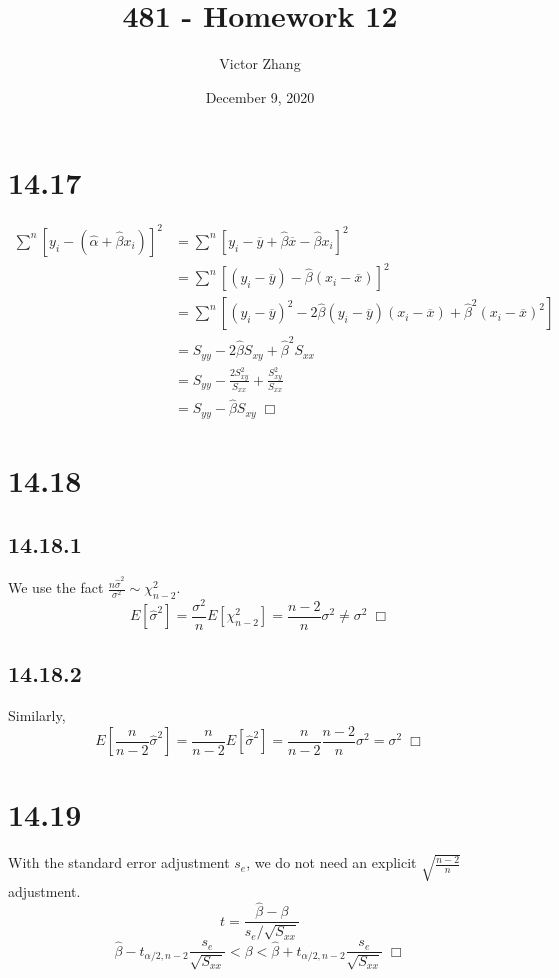 \documentclass{article}
\title{481 - Homework 12}
\author{Victor Zhang}
\date{December 9, 2020}
\begin{document}
\maketitle

\section*{14.17}
\begin{equation*}
\begin{split}
\sum\limits^n [y_i - (\hat{\alpha} + \hat{\beta}x_i)]^2 &= \sum\limits^n [y_i-\overline{y} + \hat{\beta}\overline{x} -\hat{\beta}x_i]^2\\
&= \sum\limits^n [(y_i-\overline{y}) - \hat{\beta}(x_i-\overline{x})]^2\\
&= \sum\limits^n [(y_i-\overline{y})^2 - 2\hat{\beta}(y_i-\overline{y})(x_i-\overline{x}) + \hat{\beta}^2(x_i-\overline{x})^2]\\
&= S_{yy} - 2\hat{\beta}S_{xy} + \hat{\beta}^2S_{xx}\\
&= S_{yy} -\frac{2S_{xy}^2}{S_{xx}} + \frac{S_{xy}^2}{S_{xx}}\\
&= S_{yy} - \hat{\beta}S_{xy} \; \Box
\end{split}
\end{equation*}

\section*{14.18}
\subsection*{14.18.1}
We use the fact $\frac{n\hat{\sigma}^2}{\sigma^2} \sim \chi^2_{n-2}$.
$$E[\hat{\sigma}^2] = \frac{\sigma^2}{n} E[\chi^2_{n-2}] = \frac{n-2}{n}\sigma^2 \neq \sigma^2 \;\Box$$
\subsection*{14.18.2}
Similarly,
$$E\left[\frac{n}{n-2}\hat{\sigma}^2\right] = \frac{n}{n-2} E[\hat{\sigma}^2] = \frac{n}{n-2}\frac{n-2}{n}\sigma^2 = \sigma^2 \;\Box$$

\section*{14.19}
With the standard error adjustment  $s_e$, we do not need an explicit $\sqrt{\frac{n-2}{n}}$ adjustment.
$$t = \frac{\hat{\beta}-\beta}{s_e/\sqrt{S_{xx}}}$$
$$\hat{\beta} - t_{\alpha/2,n-2}\frac{s_e}{\sqrt{S_{xx}}} < \beta < \hat{\beta} + t_{\alpha/2,n-2}\frac{s_e}{\sqrt{S_{xx}}} \;\Box$$
\end{document}
